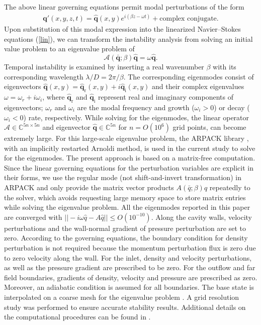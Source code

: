 \documentclass{jfm}
\begin{document}
The above linear governing equations permit modal perturbations of the form
 \begin{equation}
 \begin{split}
\boldsymbol q'(x,y,z,t) =\boldsymbol { \hat q} (x,y)e^{i(\beta z - \omega t)}+\text{complex conjugate}.
 \end{split}
 \label{modal}
\end{equation}
Upon substitution of this modal expression into the linearized Navier--Stokes equations (\ref{lin}), we can transform the instability analysis from solving an initial value problem to an eigenvalue problem of
\begin{equation}
\mathcal{A( \boldsymbol {\bar q};\beta)}\boldsymbol{\hat q}=\omega \boldsymbol{\hat q}.
\label{modal2}
\end{equation}
Temporal instability is examined by inserting a real wavenumber $\beta$ with its corresponding wavelength $\lambda/D=2\pi/\beta$. The corresponding eigenmodes consist of eigenvectors $\boldsymbol {\hat q}(x,y)=\boldsymbol {\hat q}_\text{r}(x,y)+i\boldsymbol{\hat q}_\text{i}(x,y)$ and their complex eigenvalues $\omega=\omega_r + i\omega_i$, where $\boldsymbol{\hat q}_\text{r}$ and $\boldsymbol{\hat q}_\text{i}$ represent real and imaginary components of eigenvectors; $\omega_r$ and $\omega_i$ are the modal frequency and growth ($\omega_i>0$) or decay ($\omega_i<0$) rate, respectively. While solving for the eigenmodes, the linear operator $\mathcal{A}\in \mathbb{C}^{5n \times 5n}$ and eigenvector $\boldsymbol{\hat q}\in \mathbb{C}^{5n}$ for $n={O}(10^6)$ grid points, can become extremely large. For this large-scale eigenvalue problem, the ARPACK library \citep{Arpack:96}, with an implicitly restarted Arnoldi method, is used in the current study to solve for the eigenmodes. The present approach is based on a matrix-free computation. Since the linear governing equations for the perturbation variables are explicit in their forms, we use the regular mode (not shift-and-invert transformation) in ARPACK and only provide the matrix vector products $A(\bar q; \beta)\hat q$ repeatedly to the solver, which avoids requesting large memory space to store matrix entries while solving the eigenvalue problem. All the eigenmodes reported in this paper are converged with $||-i\omega \hat q-A\hat q||\le O(10^{-10})$. Along the cavity walls, velocity perturbations and the wall-normal gradient of pressure perturbation are set to zero. According to the governing equations, the boundary condition for density perturbation is not required because the momentum perturbation flux is zero due to zero velocity along the wall. For the inlet, density and velocity perturbations, as well as the pressure gradient are prescribed to be zero. For the outflow and far field boundaries, gradients of density, velocity and pressure are prescribed as zero. Moreover, an adiabatic condition is assumed for all boundaries. The base state is interpolated on a coarse mesh for the eigenvalue problem \citep{Bergamo:AST15}. A grid resolution study was performed to ensure accurate stability results. Additional details on the computational procedures can be found in \cite{Sun:TCFD16}.
\end{document}
